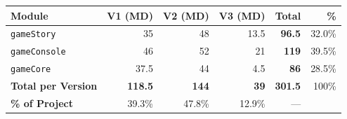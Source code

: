 \documentclass[12pt,a4paper]{article}
\begin{document}
\begin{center}
\renewcommand{\arraystretch}{1.4}
\begin{tabularx}{\linewidth}{|X|r|r|r|r|r|}
\hline
\rowcolor{headerGray!30}
\textbf{Module}
& \textbf{V1 (MD)} & \textbf{V2 (MD)} & \textbf{V3 (MD)} & \textbf{Total} & \textbf{\%} \\
\hline
\rowcolor{storyBlue!10}
\texttt{gameStory} & 35 & 48 & 13.5 & \textbf{96.5} & 32.0\% \\
\rowcolor{consoleOrange!10}
\texttt{gameConsole} & 46 & 52 & 21 & \textbf{119} & 39.5\% \\
\rowcolor{coreViolet!10}
\texttt{gameCore} & 37.5 & 44 & 4.5 & \textbf{86} & 28.5\% \\
\hline
\rowcolor{headerGray!20}
\textbf{Total per Version} & \textbf{118.5} & \textbf{144} & \textbf{39} & \textbf{301.5} & 100\% \\
\rowcolor{rowLight}
\textbf{\% of Project} & 39.3\% & 47.8\% & 12.9\% & — & \\
\hline
\end{tabularx}
\end{center}

\vspace{8pt}
\end{document}
